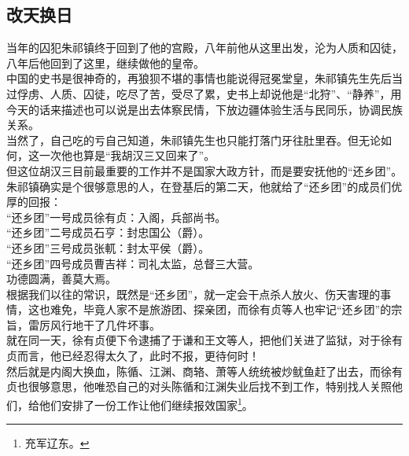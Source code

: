 	\begin{multicols}{\theparacolNo}
\fi
\subsection{改天换日}
当年的囚犯朱祁镇终于回到了他的宫殿，八年前他从这里出发，沦为人质和囚徒，八年后他回到了这里，继续做他的皇帝。\\

中国的史书是很神奇的，再狼狈不堪的事情也能说得冠冕堂皇，朱祁镇先生先后当过俘虏、人质、囚徒，吃尽了苦，受尽了累，史书上却说他是“北狩”、“静养”，用今天的话来描述也可以说是出去体察民情，下放边疆体验生活与民同乐，协调民族关系。\\

当然了，自己吃的亏自己知道，朱祁镇先生也只能打落门牙往肚里吞。但无论如何，这一次他也算是“我胡汉三又回来了”。\\

但这位胡汉三目前最重要的工作并不是国家大政方针，而是要安抚他的“还乡团”。\\

朱祁镇确实是个很够意思的人，在登基后的第二天，他就给了“还乡团”的成员们优厚的回报：\\

“还乡团”一号成员徐有贞：入阁，兵部尚书。\\

“还乡团”二号成员石亨：封忠国公（爵）。\\

“还乡团”三号成员张軏：封太平侯（爵）。\\

“还乡团”四号成员曹吉祥：司礼太监，总督三大营。\\

功德圆满，善莫大焉。\\

根据我们以往的常识，既然是“还乡团”，就一定会干点杀人放火、伤天害理的事情，这也难免，毕竟人家不是旅游团、探亲团，而徐有贞等人也牢记“还乡团”的宗旨，雷厉风行地干了几件坏事。\\

就在同一天，徐有贞便下令逮捕了于谦和王文等人，把他们关进了监狱，对于徐有贞而言，他已经忍得太久了，此时不报，更待何时！\\

然后就是内阁大换血，陈循、江渊、商辂、萧等人统统被炒鱿鱼赶了出去，而徐有贞也很够意思，他唯恐自己的对头陈循和江渊失业后找不到工作，特别找人关照他们，给他们安排了一份工作让他们继续报效国家\footnote{充军辽东。}。\\


\end{multicols}
